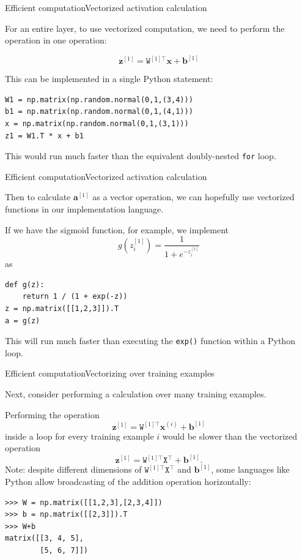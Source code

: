 \documentclass{beamer}
\renewcommand{\vec}[1]{\boldsymbol{#1}}
\newcommand{\mat}[1]{\mathtt{#1}}
\begin{document}
  
\begin{frame}[fragile]{Efficient computation}{Vectorized activation calculation}

  For an entire layer, to use vectorized computation, we need to perform
  the operation in one operation:

  \[ \vec{z}^{[1]} = \mat{W}^{[1]\top} \vec{x} + \vec{b}^{[1]} \]

  This can be implemented in a single Python statement:

\begin{verbatim}
W1 = np.matrix(np.random.normal(0,1,(3,4)))
b1 = np.matrix(np.random.normal(0,1,(4,1)))
x = np.matrix(np.random.normal(0,1,(3,1)))
z1 = W1.T * x + b1
\end{verbatim}

  This would run much faster than the equivalent doubly-nested
  \texttt{for} loop.

\end{frame}

  
\begin{frame}[fragile]{Efficient computation}{Vectorized activation calculation}

  Then to calculate $\vec{a}^{[1]}$ as a vector operation, we can
  hopefully use vectorized functions in our implementation language.

  \medskip

  If we have the sigmoid function, for example, we implement
  \[ g(z_i^{[1]}) = \frac{1}{1+e^{-z_i^{[1]}}} \]
  as
  \begin{verbatim}
def g(z):
    return 1 / (1 + exp(-z))
z = np.matrix([[1,2,3]]).T
a = g(z)
  \end{verbatim}

  This will run much faster than executing the \texttt{exp()} function
  within a Python loop.
  
\end{frame}

  
\begin{frame}[fragile]{Efficient computation}{Vectorizing over training examples}

  Next, consider performing a calculation over \alert{many training examples}.

  \medskip

  Performing the operation
  \[ \vec{z}^{[1]} = \mat{W}^{[1]\top} \vec{x}^{(i)} + \vec{b}^{[1]} \]
  inside a loop for every training example $i$ would be slower than the
  vectorized operation
  \[ \vec{z}^{[1]} = \mat{W}^{[1]\top} \mat{X}^\top + \vec{b}^{[1]}. \]
  Note: despite different dimensions of
  $\mat{W}^{[1]\top} \mat{X}^\top$ and $\vec{b}^{[1]}$,
  some languages like Python allow \alert{broadcasting} of the addition
  operation horizontally:
  \begin{verbatim}
>>> W = np.matrix([[1,2,3],[2,3,4]])
>>> b = np.matrix([[2,3]]).T
>>> W+b
matrix([[3, 4, 5],
        [5, 6, 7]])
\end{verbatim}  

\end{frame}
\end{document}
